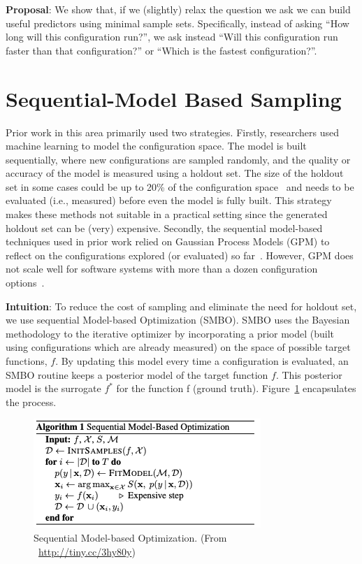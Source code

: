 \noindent\textbf{Proposal}: 
We show that, if we (slightly) relax the question
we ask we can build useful predictors using minimal sample sets.
Specifically, instead of asking ``How long will this configuration
run?'', we ask instead ``Will this configuration run faster than that
configuration?'' or ``Which is the fastest configuration?''.


\section{Sequential-Model Based Sampling}
Prior work in this area primarily used two strategies.
Firstly, researchers used machine learning to model the configuration
space. The model is built sequentially, where new
configurations are sampled randomly, and the quality or
accuracy of the model is measured using a holdout set. The
size of the holdout set in some cases could be up to 20\% of
the configuration space~\cite{nair2017using} and needs to be evaluated (i.e.,
measured) before even the model is fully built. This strategy
makes these methods not suitable in a practical setting since
the generated holdout set can be (very) expensive. Secondly,
the sequential model-based techniques used in prior work
relied on Gaussian Process Models (GPM) to reflect on the
configurations explored (or evaluated) so far~\cite{zuluaga2016varepsilon}. However,
GPM does not scale well for software systems with more than
a dozen configuration options~\cite{wang2016bayesian}.



\noindent\textbf{Intuition}: 
To reduce the cost of sampling and eliminate the need for holdout set, we use sequential Model-based Optimization (SMBO). SMBO uses the Bayesian methodology to the iterative optimizer by incorporating a prior model (built using configurations which are already measured) on the space of possible target functions, $f$. By updating this model every time a configuration is evaluated, an SMBO routine keeps a posterior model of the target function $f$. This posterior model is the surrogate $f^*$ for the function f (ground truth). Figure~\ref{fig:chap1_smbo} encapsulates the process.

\begin{figure}[!htbp]
    \centering
    \includegraphics[width=0.6\linewidth]{Chapter-Introduction/Figures/bayesian_opt.png}
    \caption[Algorithm for SMBO methods]{Sequential Model-based Optimization. (From ~\url{http://tiny.cc/3hy80y})}
    \label{fig:chap1_smbo}
\end{figure}

